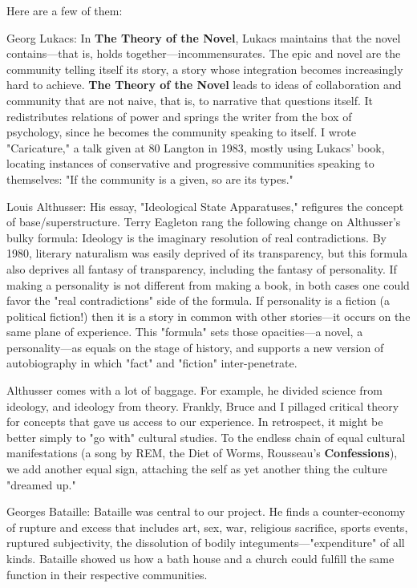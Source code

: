 Here are a few of them:

Georg Lukacs: In \textbf{The Theory of the Novel}, Lukacs maintains that
the novel contains---that is, holds together---incommensurates. The epic
and novel are the community telling itself its story, a story whose
integration becomes increasingly hard to achieve. \textbf{The Theory of
the Novel} leads to ideas of collaboration and community that are not
naive, that is, to narrative that questions itself. It redistributes
relations of power and springs the writer from the box of psychology,
since he becomes the community speaking to itself. I wrote "Caricature,"
a talk given at 80 Langton in 1983, mostly using Lukacs' book, locating
instances of conservative and progressive communities speaking to
themselves: "If the community is a given, so are its types."

Louis Althusser: His essay, "Ideological State Apparatuses," refigures
the concept of base/superstructure. Terry Eagleton rang the following
change on Althusser's bulky formula: Ideology is the imaginary
resolution of real contradictions. By 1980, literary naturalism was
easily deprived of its transparency, but this formula also deprives all
fantasy of transparency, including the fantasy of personality. If making
a personality is not different from making a book, in both cases one
could favor the "real contradictions" side of the formula. If
personality is a fiction (a political fiction!) then it is a story in
common with other stories---it occurs on the same plane of experience.
This "formula" sets those opacities---a novel, a personality---as equals
on the stage of history, and supports a new version of autobiography in
which "fact" and "fiction" inter-penetrate.

Althusser comes with a lot of baggage. For example, he divided science
from ideology, and ideology from theory. Frankly, Bruce and I pillaged
critical theory for concepts that gave us access to our experience. In
retrospect, it might be better simply to "go with" cultural studies. To
the endless chain of equal cultural manifestations (a song by REM, the
Diet of Worms, Rousseau's \textbf{Confessions}), we add another equal
sign, attaching the self as yet another thing the culture "dreamed up."

Georges Bataille: Bataille was central to our project. He finds a
counter-economy of rupture and excess that includes art, sex, war,
religious sacrifice, sports events, ruptured subjectivity, the
dissolution of bodily integuments---"expenditure" of all kinds. Bataille
showed us how a bath house and a church could fulfill the same function
in their respective communities.

